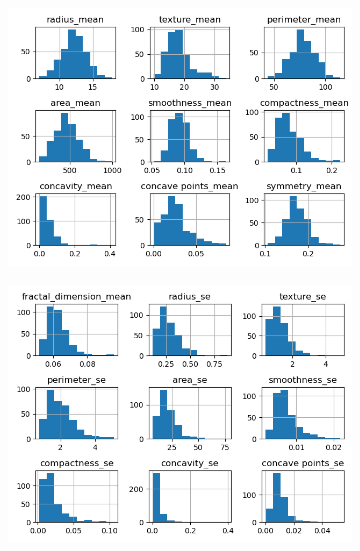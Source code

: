 \begin{figure}[H]
     \centering
     \begin{subfigure}[b]{0.3\textwidth}
 \centering
\includegraphics[scale=0.3]{images/hist_cancer_no_1.png}
     \end{subfigure}
     \hfill
     \begin{subfigure}[b]{0.3\textwidth}
         \centering
 \centering
\includegraphics[scale=0.3]{images/hist_cancer_no_2.png}
     \end{subfigure}
     \hfill
     \begin{subfigure}[b]{0.3\textwidth}
 \centering

\end{subfigure}
\end{figure}
